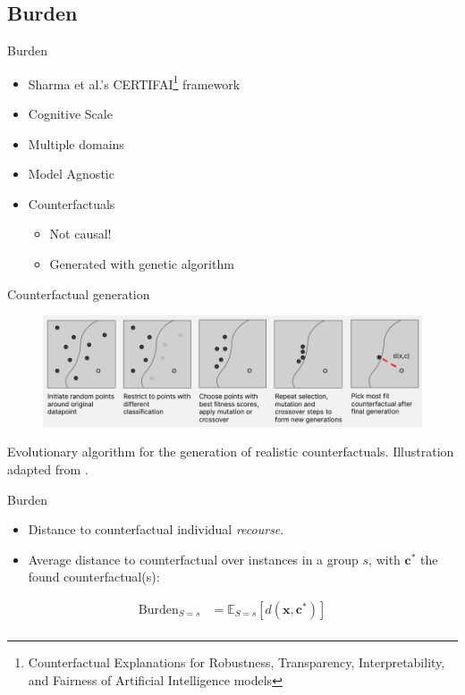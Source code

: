 \documentclass[aspectratio=169]{beamer}
\begin{document}
\subsection{Burden}

\begin{frame}{Burden}
    \begin{itemize}
        \item Sharma et al.'s CERTIFAI\footnote{Counterfactual Explanations for Robustness, Transparency, Interpretability, and Fairness of Artificial Intelligence models} framework \cite{certifai}
        \item Cognitive Scale
        \item Multiple domains
        \item Model Agnostic
        \item Counterfactuals
        \begin{itemize}
            \item \alert{Not causal!}
            \item Generated with genetic algorithm
        \end{itemize}
    \end{itemize}
\end{frame}

\begin{frame}{Counterfactual generation}
    \begin{figure}
    \centering
    \includegraphics[width=\textwidth]{img/counterfactual_generation_burden.png}
    \end{figure}
    Evolutionary algorithm for the generation of realistic counterfactuals. Illustration adapted from \cite{certifai}.
\end{frame}

\begin{frame}{Burden}
    \begin{itemize}
        \item Distance to counterfactual \textrightarrow individual \emph{recourse}.
        \item Average distance to counterfactual over instances in a group $s$, with $\mathbf{c^*}$ the found counterfactual(s):
    \end{itemize}
    \begin{align*}\label{eq:burden}
        \text{Burden}_{S=s} &= \mathbb{E}_{S=s}[d(\mathbf{x}, \mathbf{c^*})] \\
    \end{align*}
\end{frame}
\end{document}

